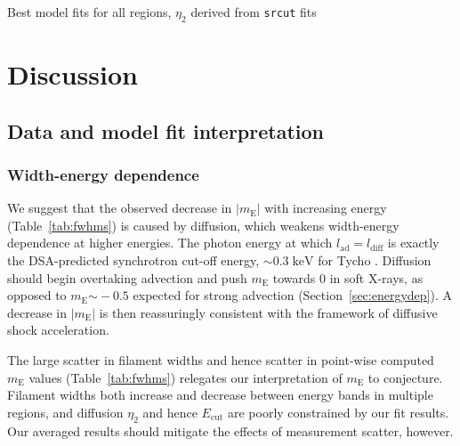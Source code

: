 \documentclass[iop, apj, numberedappendix]{emulateapj}
\newcommand*{\mt}{\mathrm}
\newcommand*{\unit}[1]{\;\mt{#1}}  %
\newcommand*{\abt}{\mathord{\sim}} %
\newcommand*{\mE}{m_\mt{E}}
\newcommand*{\Ecut}{E_{\mt{cut}}}
\begin{document}

\begin{table}
    \scriptsize
    \centering
    \caption{Best model fits for all regions, $\eta_2$ derived from
        \texttt{srcut} fits
    \label{tab:fits-all-srcutlog}}
    
\end{table}



\section{Discussion}

\subsection{Data and model fit interpretation}

\subsubsection{Width-energy dependence}

We suggest that the observed decrease in $|\mE|$ with increasing energy
(Table~\ref{tab:fwhms}) is caused by diffusion, which weakens width-energy
dependence at higher energies.  The photon energy at which $l_{\mt{ad}} =
l_{\mt{diff}}$ is exactly the DSA-predicted synchrotron cut-off energy,
$\abt0.3 \unit{keV}$ for Tycho \citep{hwang2002}.
Diffusion should begin overtaking advection and push $\mE$ towards $0$ in soft
X-rays, as opposed to $\mE \abt -0.5$ expected for strong advection
(Section~\ref{sec:energydep}).  A decrease in $|\mE|$ is then reassuringly
consistent with the framework of diffusive shock acceleration.

The large scatter in filament widths and hence scatter in point-wise computed
$\mE$ values (Table~\ref{tab:fwhms}) relegates our interpretation of $\mE$ to
conjecture.  Filament widths both increase and decrease between energy bands in
multiple regions, and diffusion $\eta_2$ and hence $\Ecut$ are poorly
constrained by our fit results.  Our averaged results should mitigate the
effects of measurement scatter, however.
\end{document}
